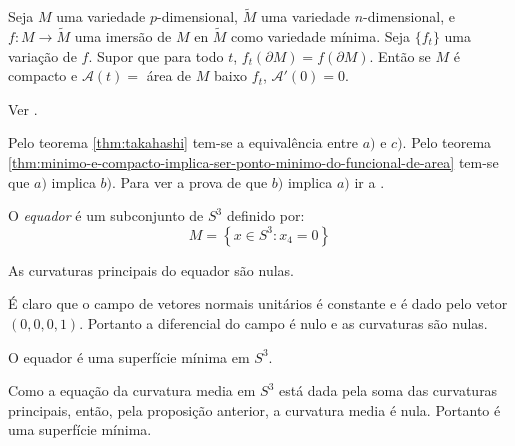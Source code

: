 \begin{teorema}\label{thm:minimo-e-compacto-implica-ser-ponto-minimo-do-funcional-de-area}
	Seja $M$ uma variedade $p$-dimensional, $\tilde{M}$ uma variedade $n$-dimensional, e $f: M \rightarrow \tilde{M}$ uma imersão de $M$ en $\tilde{M}$ como variedade mínima.
	Seja $\{ f_t \}$ uma variação de $f$. Supor que para todo $t$, $ f_t(\partial M) = f(\partial M) $. Então se $M$ é compacto e $\mathcal{A}(t) =$ área de $M$ baixo $f_t$, $\mathcal{A}'(0)=0$.
\end{teorema}

\begin{demonstracao}
	Ver \cite[Theorem 3.2.1]{Simons1968}.
\end{demonstracao}



\begin{demonstracao}
	Pelo teorema \ref{thm:takahashi} tem-se a equivalência entre $a)$ e $c)$. Pelo teorema \ref{thm:minimo-e-compacto-implica-ser-ponto-minimo-do-funcional-de-area} tem-se que $a)$ implica $b)$. Para ver a prova de que $b)$ implica $a)$ ir a \cite[\S 2.4]{Simons1968}.
\end{demonstracao}

\begin{definicao}
	O \emph{equador} é um subconjunto de $S^3$ definido por:
	\begin{equation}
	M = \left\{ x \in S^3: x_4 = 0 \right\}
	\end{equation}
\end{definicao}

\begin{proposicao}
	As curvaturas principais do equador são nulas.
\end{proposicao}

\begin{demonstracao}
	É claro que o campo de vetores normais unitários é constante e é dado pelo vetor $(0,0,0,1)$. Portanto a diferencial do campo é nulo e as curvaturas são nulas.
\end{demonstracao}

\begin{corolario}
	O equador é uma superfície mínima em $S^3$.
\end{corolario}

\begin{demonstracao}
	Como a equação da curvatura media em $S^3$ está dada pela soma das curvaturas principais, então, pela proposição anterior, a curvatura media é nula. Portanto é uma superfície mínima.
\end{demonstracao}

